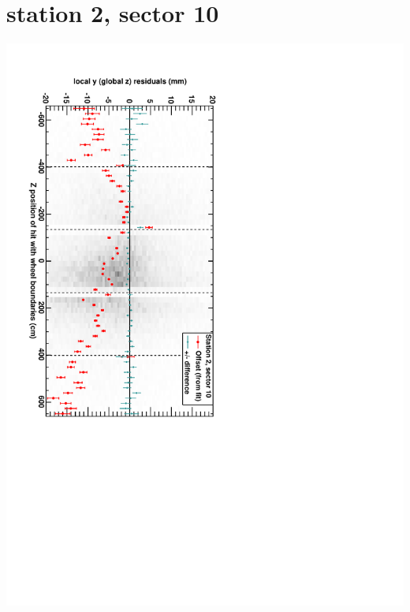 \documentclass[compress]{beamer}
\begin{document}
\section*{station 2, sector 10}
\begin{frame} \vfill \mbox{\hspace{-1 cm}\includegraphics[height=1.2\linewidth, angle=90]{DTzVsZ_st2_sr10.pdf}} \end{frame}
\end{document}
